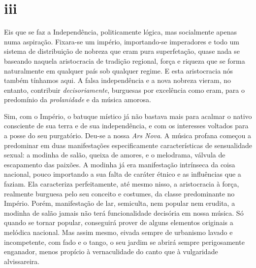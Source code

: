 \section*{iii}

Eis que se faz a Independência, politicamente lógica, mas socialmente
apenas numa aspiração. Fixara-se um império, importando-se imperadores e
todo um sistema de distribuição de nobreza que eram pura superfetação,
quase nada se baseando naquela aristocracia de tradição regional, força
e riqueza que se forma naturalmente em qualquer país sob qualquer
regime. E esta aristocracia nós também tínhamos aqui. A falsa
independência e a nova nobreza vieram, no entanto, contribuir
\textit{decisoriamente}, burguesas por excelência como eram, para o predomínio da
\textit{prolanidade} e da música amorosa.

Sim, com o Império, o batuque místico já não bastava mais para acalmar o
nativo consciente de sua terra e de sua independência, e com os
interesses voltados para a posse do seu purgatório. Deu-se a nossa \textit{Ars
Nova}. A música profana começou a predominar em duas manifestações
especificamente características de sensualidade sexual: a modinha de
salão, queixa de amores, e o melodrama, válvula de escapamento das
paixões. A modinha já era manifestação intrínseca da coisa nacional,
pouco importando a sua falta de caráter étnico e as influências que a
faziam. Ela caracteriza perfeitamente, até mesmo nisso, a aristocracia à
força, realmente burguesa pelo seu conceito e costumes, da classe
predominante no Império. Porém, manifestação de lar, semiculta, nem
popular nem erudita, a modinha de salão jamais não terá funcionalidade
decisória em nossa música. Só quando se tornar popular, conseguirá
prover de alguns elementos originais a melódica nacional. Mas assim
mesmo, eivada sempre de urbanismo lavado e incompetente, com fado e o
tango, o seu jardim se abrirá sempre perigosamente enganador, menos
propício à vernaculidade do canto que à vulgaridade alvissareira.

